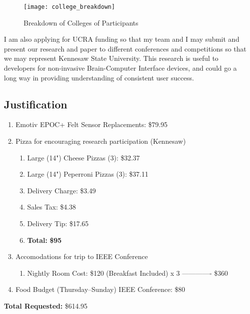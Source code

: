 \documentclass{article}
\begin{document}
\begin{figure}[H]
    \centering
    \texttt{[image: college\_breakdown]}
    \caption{Breakdown of Colleges of Participants}
    \label{fig:my_label}
\end{figure}

I am also applying for UCRA funding so that my team and I may submit and present our research and paper to different conferences and competitions so that we may represent Kennesaw State University. This research is useful to developers for non-invasive Brain-Computer Interface devices, and could go a long way in providing understanding of consistent user success.
\newpage
\subsection*{Justification}
\begin{enumerate}
    \item Emotiv EPOC+ Felt Sensor Replacements: \$79.95
    \item Pizza for encouraging research participation (Kennesaw) 
    \begin{enumerate}
        \item[] Large (14") Cheese Pizzas (3): \$32.37
        \item[] Large (14") Peperroni Pizzas (3): \$37.11
        \item[] Delivery Charge: \$3.49
        \item[] Sales Tax: \$4.38
        \item[] Delivery Tip: \$17.65
        \item[] \textbf{Total:} \textbf{\$95}
    \end{enumerate}
       
      \item Accomodations for trip to IEEE Conference
      \begin{enumerate}
          \item[] Nightly Room Cost: \$120 (Breakfast Included)
          \newline
          x 3
          \newline
        -------------
        \newline
        \$360
      \end{enumerate}
      \item Food Budget (Thursday--Sunday) IEEE Conference: \$80
\end{enumerate}
\textbf{Total Requested:} \$614.95
\end{document}
